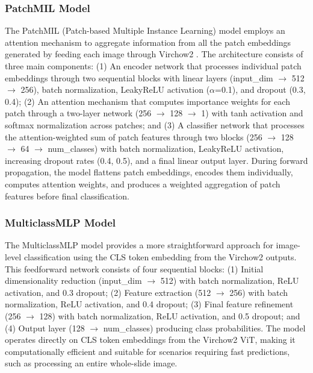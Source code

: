 \documentclass[a4paper,12pt]{article}
\begin{document}
\subsubsection{PatchMIL Model}
The PatchMIL (Patch-based Multiple Instance Learning) model employs an attention mechanism to aggregate information from all the patch embeddings generated by feeding each image through Virchow2 \cite{vaswani_attention_2023}. The architecture consists of three main components: (1) An encoder network that processes individual patch embeddings through two sequential blocks with linear layers (input\_dim $\rightarrow$ 512 $\rightarrow$ 256), batch normalization, LeakyReLU activation ($\alpha$=0.1), and dropout (0.3, 0.4); (2) An attention mechanism that computes importance weights for each patch through a two-layer network (256 $\rightarrow$ 128 $\rightarrow$ 1) with tanh activation and softmax normalization across patches; and (3) A classifier network that processes the attention-weighted sum of patch features through two blocks (256 $\rightarrow$ 128 $\rightarrow$ 64 $\rightarrow$ num\_classes) with batch normalization, LeakyReLU activation, increasing dropout rates (0.4, 0.5), and a final linear output layer. During forward propagation, the model flattens patch embeddings, encodes them individually, computes attention weights, and produces a weighted aggregation of patch features before final classification.

\subsubsection{MulticlassMLP Model}
The MulticlassMLP model provides a more straightforward approach for image-level classification using the CLS token embedding from the Virchow2 outputs. This feedforward network consists of four sequential blocks: (1) Initial dimensionality reduction (input\_dim $\rightarrow$ 512) with batch normalization, ReLU activation, and 0.3 dropout; (2) Feature extraction (512 $\rightarrow$ 256) with batch normalization, ReLU activation, and 0.4 dropout; (3) Final feature refinement (256 $\rightarrow$ 128) with batch normalization, ReLU activation, and 0.5 dropout; and (4) Output layer (128 $\rightarrow$ num\_classes) producing class probabilities. The model operates directly on CLS token embeddings from the Virchow2 ViT, making it computationally efficient and suitable for scenarios requiring fast predictions, such as processing an entire whole-slide image.
\end{document}
